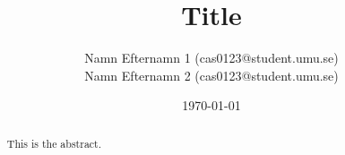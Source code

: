 \title{Title}
\author{Namn Efternamn 1 (cas0123@student.umu.se) \\
        Namn Efternamn 2 (cas0123@student.umu.se)}
\date{\today}

\begin{titlepage}
  \maketitle
  \thispagestyle{fancy}
  \rhead{\today}
  \begin{abstract}
    This is the abstract.
  \end{abstract}
\end{titlepage}
